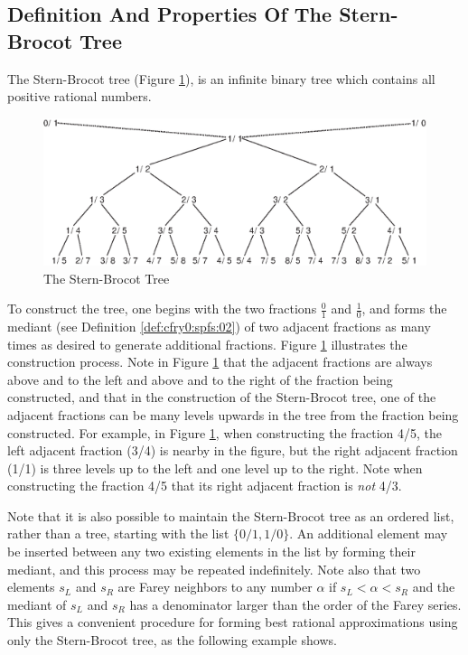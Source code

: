 \subsection{Definition And Properties Of The Stern-Brocot Tree}
\label{ccfr0:ssbt0:sdpt0}

The Stern-Brocot tree 
(Figure \ref{fig:ccfr0:ssbt0:sdpt0:00}), is 
an infinite binary tree which contains all positive rational numbers.

\begin{figure}
\centering
\includegraphics[width=4.6in]{c_cfr0/sbtdpt01.eps}
\caption{The Stern-Brocot Tree}
\label{fig:ccfr0:ssbt0:sdpt0:00}
\end{figure}

To construct the tree, one begins with the two fractions $\frac{0}{1}$
and $\frac{1}{0}$, and forms the mediant (see Definition 
\ref{def:cfry0:spfs:02})
of two adjacent fractions as many
times as desired to generate additional fractions.
Figure \ref{fig:ccfr0:ssbt0:sdpt0:00} illustrates the construction process.
Note in Figure \ref{fig:ccfr0:ssbt0:sdpt0:00} that the adjacent fractions
are always above and to the left and above and to the right of the fraction
being constructed, and that in the construction of the Stern-Brocot
tree, one of the adjacent fractions can be many levels upwards in the tree
from the fraction being constructed.  For example, in 
Figure \ref{fig:ccfr0:ssbt0:sdpt0:00}, when constructing the fraction 
4/5, the left adjacent fraction (3/4) is nearby in the figure, but 
the right adjacent fraction (1/1) is three levels up to the left and
one level up to the right.  Note when constructing the fraction 4/5 that
its right adjacent fraction is \emph{not} 4/3.

Note that it is also possible to maintain the Stern-Brocot tree as an
ordered list, rather than a tree, starting with the list
$\{0/1, 1/0\}$.  An additional element may be inserted
between any two existing elements in the list by forming their mediant,
and this process may be repeated indefinitely.  Note also that two 
elements $s_L$ and $s_R$ are Farey neighbors to any number $\alpha$
if $s_L < \alpha < s_R$ and the mediant of $s_L$ and $s_R$ has a
denominator larger than the order of the Farey series.  This gives a convenient
procedure for forming best rational approximations using only the Stern-Brocot
tree, as the following example shows.

